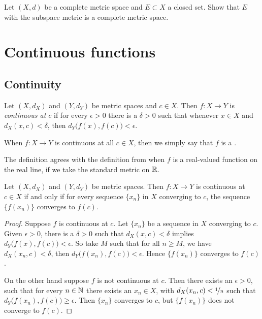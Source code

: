 \begin{exercise} \label{exercise:closedcomplete}
Let $(X,d)$ be a complete metric space and $E \subset X$ a closed set.
Show that $E$ with the subspace metric is a complete metric space.
\end{exercise}


\sectionnewpage
\section{Continuous functions}
\label{sec:metcont}


\subsection{Continuity}

\begin{defn}
Let $(X,d_X)$ and $(Y,d_Y)$ be metric spaces and $c \in X$.
Then $f \colon X \to Y$ is
\emph{continuous at $c$}
if for every $\epsilon > 0$
there is a $\delta > 0$ such that whenever $x \in X$ and $d_X(x,c) <
\delta$, then
$d_Y\bigl(f(x),f(c)\bigr) < \epsilon$.

\medskip

When $f \colon X \to Y$ is continuous at all $c \in X$, then we simply say
that $f$ is a \emph{}.
\end{defn}

The definition agrees with the definition from  when
$f$ is a real-valued function on the real line, if we take the standard
metric on ${\mathbb{R}}$.

\begin{prop} \label{prop:contiscont}
Let $(X,d_X)$ and $(Y,d_Y)$ be metric spaces.
Then $f \colon X \to Y$ is
continuous at $c \in X$
if and only if for every sequence $\{ x_n \}$ in $X$
converging to $c$, the sequence $\{ f(x_n) \}$ converges
to $f(c)$.
\end{prop}

\begin{proof}
Suppose $f$ is continuous at $c$.  Let $\{ x_n \}$ be a
sequence in $X$ converging to $c$.  Given $\epsilon > 0$,
there is a $\delta > 0$ such that $d_X(x,c) < \delta$ implies
$d_Y\bigl(f(x),f(c)\bigr) < \epsilon$.  So take $M$ such that
for all $n \geq M$, we have $d_X(x_n,c) < \delta$, then
$d_Y\bigl(f(x_n),f(c)\bigr) < \epsilon$.  Hence $\{ f(x_n) \}$
converges to $f(c)$.

On the other hand suppose $f$ is not continuous at $c$.
Then there exists an $\epsilon > 0$,
such that for every $n \in {\mathbb{N}}$ there exists an $x_n \in X$,
with
$d_X(x_n,c) < \nicefrac{1}{n}$ such that $d_Y\bigl(f(x_n),f(c)\bigr) \geq
\epsilon$.  Then $\{ x_n \}$ converges to $c$, but $\{ f(x_n) \}$
does not converge to $f(c)$.
\end{proof}

